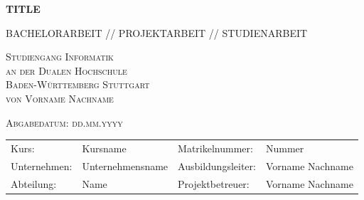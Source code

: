 \documentclass[12pt]{report}
\begin{document}
 
	\begin{titlepage}
		\thispagestyle{titlepage}
		\newcommand\HRule{\rule{\textwidth}{1pt}} %

		
		\begin{center}
			
			\vspace*{2cm}
			
			{ \huge \bfseries TITLE}
			
			\vspace*{1.5cm}
			
			\textsc{\Large BACHELORARBEIT // PROJEKTARBEIT // STUDIENARBEIT}
			
			\vspace*{3cm}
			
			\textsc{\LARGE Studiengang Informatik}\\[0.3cm]
			\textsc{\LARGE an der Dualen Hochschule}\\[0.3cm]
			\textsc{\LARGE Baden-Württemberg Stuttgart}\\[2.5cm]

			
			\textsc{\Large von Vorname Nachname}
			
			\vspace*{1.5cm}
			
			\textsc{\Large Abgabedatum: dd.mm.yyyy}

			\begin{table}[bp]
				\begin{tabular}{l l l l}
					Kurs: & Kursname & Matrikelnummer: & Nummer  \\
					Unternehmen: & Unternehmensname & Ausbildungsleiter: & Vorname Nachname\\
					Abteilung: &  Name & Projektbetreuer: &  Vorname Nachname\\
				\end{tabular}
			\end{table}
			
			
		\end{center}
		
	\end{titlepage}


\fancypagestyle{plain}{
	\fancyfoot[L]{Vorname Nachname\\
		 - Kurs}
	\fancyfoot[C]{Seite \thepage\ }%
	\fancyfoot[R]{04.09.2023}
}
\end{document}
